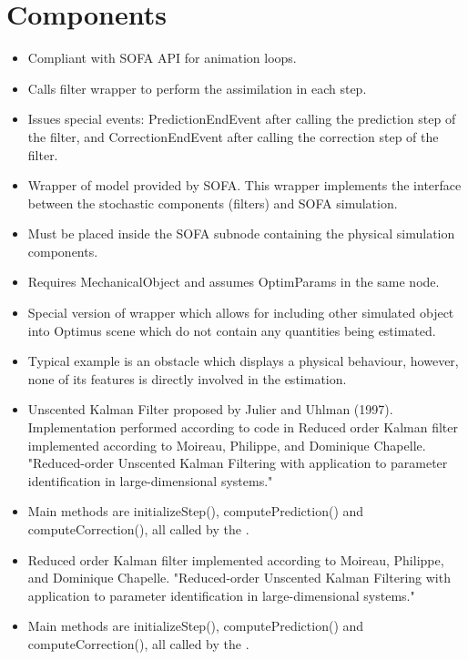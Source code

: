 \documentclass[10pt]{article}
\begin{document}
\section{Components}
{\large \al}
\begin{itemize}
\item Compliant with SOFA API for animation loops. 
\item Calls filter wrapper to perform the assimilation in each step.
\item Issues special events: PredictionEndEvent after calling the prediction step of the filter, and CorrectionEndEvent after calling the correction step of the filter.
\end{itemize}
\medskip
{\large\ssw}
\begin{itemize}
\item Wrapper of model provided by SOFA. This wrapper implements the interface between the stochastic components (filters) and SOFA simulation.
\item Must be placed inside the SOFA subnode containing the physical simulation components.
\item Requires MechanicalObject and assumes OptimParams in the same node.
\end{itemize}
\medskip
{\large\psw}
\begin{itemize}
\item Special version of wrapper which allows for including other simulated object into Optimus scene which do not contain any quantities being estimated.
\item Typical example is an obstacle which displays a physical behaviour, however, none of its features is directly involved in the estimation.
\end{itemize}
\medskip
{\large \ukf}
\begin{itemize}
\item Unscented Kalman Filter proposed by Julier and Uhlman (1997). Implementation performed according to code in Reduced order Kalman filter implemented according to Moireau, Philippe, and Dominique Chapelle. "Reduced-order Unscented Kalman Filtering with application to parameter identification in large-dimensional systems."
\item Main methods are initializeStep(), computePrediction() and computeCorrection(), all called by the \al.
\end{itemize}
\medskip
{\large \roukf}
\begin{itemize}
\item Reduced order Kalman filter implemented according to Moireau, Philippe, and Dominique Chapelle. "Reduced-order Unscented Kalman Filtering with application to parameter identification in large-dimensional systems."
\item Main methods are initializeStep(), computePrediction() and computeCorrection(), all called by the \al.
\end{itemize}
\end{document}
